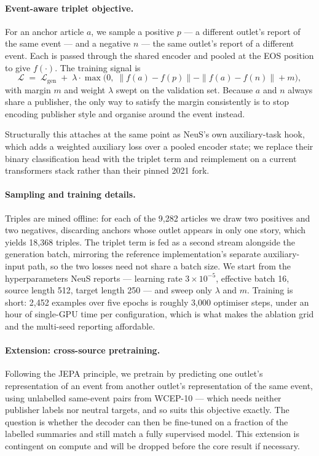 \documentclass[10pt,twocolumn,a4paper]{article}
\begin{document}
\paragraph{Event-aware triplet objective.} For an anchor article $a$, we sample a
positive $p$ --- a different outlet's report of the same event --- and a negative
$n$ --- the same outlet's report of a different event. Each is passed through the
shared encoder and pooled at the EOS position to give $f(\cdot)$. The training
signal is
\[
\mathcal{L} \;=\; \mathcal{L}_{\text{gen}} \;+\; \lambda \cdot
\max\!\big(0,\; \|f(a)-f(p)\| - \|f(a)-f(n)\| + m \big),
\]
with margin $m$ and weight $\lambda$ swept on the validation set. Because $a$ and
$n$ always share a publisher, the only way to satisfy the margin consistently is
to stop encoding publisher style and organise around the event instead.

Structurally this attaches at the same point as NeuS's own auxiliary-task hook,
which adds a weighted auxiliary loss over a pooled encoder state; we replace
their binary classification head with the triplet term and reimplement on a
current transformers stack rather than their pinned 2021 fork.

\paragraph{Sampling and training details.} Triples are mined offline: for each of
the 9{,}282 articles we draw two positives and two negatives, discarding anchors
whose outlet appears in only one story, which yields 18{,}368 triples. The
triplet term is fed as a second stream alongside the generation batch, mirroring
the reference implementation's separate auxiliary-input path, so the two losses
need not share a batch size. We start from the hyperparameters NeuS reports ---
learning rate $3\!\times\!10^{-5}$, effective batch 16, source length 512, target
length 250 --- and sweep only $\lambda$ and $m$. Training is short: 2{,}452
examples over five epochs is roughly 3{,}000 optimiser steps, under an hour of
single-GPU time per configuration, which is what makes the ablation grid and the
multi-seed reporting affordable.

\paragraph{Extension: cross-source pretraining.} Following the JEPA principle, we
pretrain by predicting one outlet's representation of an event from another
outlet's representation of the same event, using unlabelled same-event pairs from
WCEP-10 --- which needs neither publisher labels nor neutral targets, and so
suits this objective exactly. The question is whether the decoder can then be
fine-tuned on a fraction of the labelled summaries and still match a fully
supervised model. This extension is contingent on compute and will be dropped
before the core result if necessary.
\end{document}
